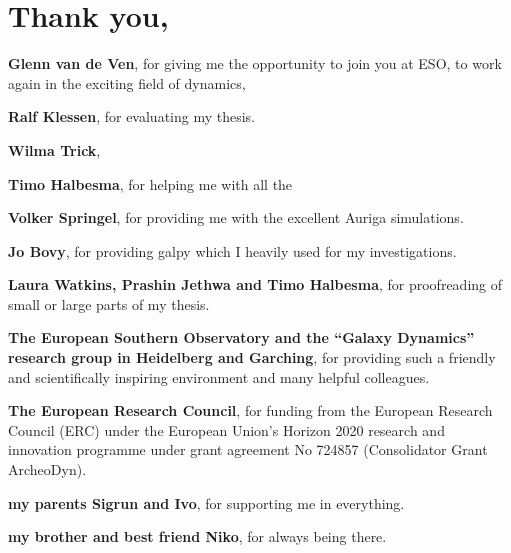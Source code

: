 \section*{Thank you,}

\textbf{Glenn van de Ven}, for giving me the opportunity to join you at ESO, to work again in the exciting field of dynamics, 

\textbf{Ralf Klessen}, for evaluating my thesis.

\textbf{Wilma Trick},

\textbf{Timo Halbesma}, for helping me with all the 

\textbf{Volker Springel}, for providing me with the excellent Auriga simulations.

\textbf{Jo Bovy}, for providing galpy which I heavily used for my investigations.

\textbf{Laura Watkins, Prashin Jethwa and Timo Halbesma}, for proofreading of small or large parts of my thesis.

\textbf{The European Southern Observatory and the “Galaxy Dynamics” research group in Heidelberg and Garching}, for providing such a friendly and scientifically inspiring environment and many helpful colleagues.

\textbf{The European Research Council}, for funding from the European Research Council (ERC) under the European Union's Horizon 2020 research and innovation programme under grant agreement No 724857 (Consolidator Grant ArcheoDyn).

\textbf{my parents Sigrun and Ivo}, for supporting me in everything.

\textbf{my brother and best friend Niko}, for always being there.